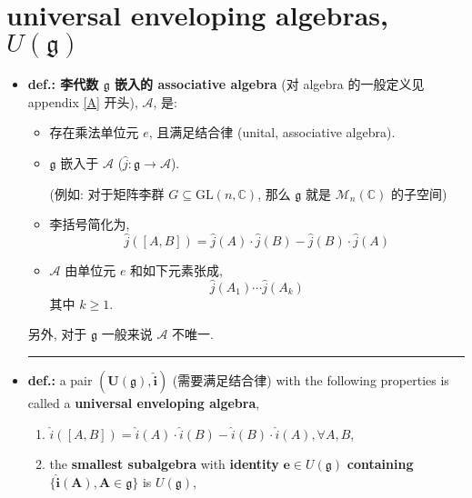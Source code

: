 \section{universal enveloping algebras, \texorpdfstring{$U(\mathfrak{g})$}{U(g)}}
\begin{itemize}
	\item \textbf{def.: 李代数 $\boldsymbol{\mathfrak{g}}$ 嵌入的 associative algebra} (对 algebra 的一般定义见 appendix \ref{A} 开头), $\mathcal{A}$, 是:
	\begin{itemize}
		\item 存在乘法单位元 $e$, 且满足结合律 (unital, associative algebra).
		
		\item $\mathfrak{g}$ 嵌入于 $\mathcal{A}$ ($\hat{j} : \mathfrak{g} \rightarrow \mathcal{A}$).
		
		(例如: 对于矩阵李群 $G \subseteq \mathrm{GL}(n, \mathbb{C})$, 那么 $\mathfrak{g}$ 就是 $\mathcal{M}_n(\mathbb{C})$ 的子空间)
		
		\item 李括号简化为,
		\begin{equation}
			\hat{j}([A, B]) = \hat{j}(A) \cdot \hat{j}(B) - \hat{j}(B) \cdot \hat{j}(A)
		\end{equation}
		
		\item $\mathcal{A}$ 由单位元 $e$ 和如下元素张成,
		\begin{equation} \label{8.3.2}
			\hat{j}(A_1) \cdots \hat{j}(A_k)
		\end{equation}
		其中 $k \geq 1$.
	\end{itemize}
	另外, 对于 $\mathfrak{g}$ 一般来说 $\mathcal{A}$ 不唯一.
	
	\noindent\rule[0.5ex]{\linewidth}{0.5pt} %
	
	\item \textbf{def.:} a pair $\boldsymbol{(U(\mathfrak{g}), \hat{i})}$ (需要满足结合律) with the following properties is called a \textbf{universal enveloping algebra},
	\begin{enumerate}
		\item $\hat{i}([A, B]) = \hat{i}(A) \cdot \hat{i}(B) - \hat{i}(B) \cdot \hat{i}(A), \forall A, B$,
		
		\item the \textbf{smallest subalgebra} with \textbf{identity} $\boldsymbol{e} \in U(\mathfrak{g})$ \textbf{containing} $\boldsymbol{\{\hat{i}(A), A \in \mathfrak{g}\}}$ is $U(\mathfrak{g})$,
		

\end{enumerate}
\end{itemize}

